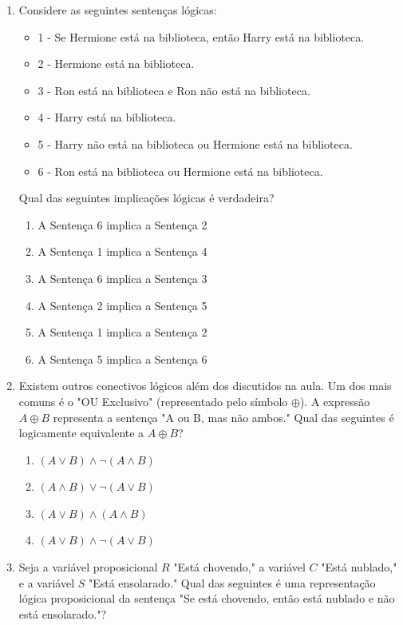 \documentclass[a4paper,12pt]{article}
\begin{document}
\begin{enumerate}
\item Considere as seguintes sentenças lógicas:

\begin{itemize}
    \item 1 - Se Hermione está na biblioteca, então Harry está na biblioteca.
    \item 2 - Hermione está na biblioteca.
    \item 3 - Ron está na biblioteca e Ron não está na biblioteca.
    \item 4 - Harry está na biblioteca.
    \item 5 - Harry não está na biblioteca ou Hermione está na biblioteca.
    \item 6 - Ron está na biblioteca ou Hermione está na biblioteca.
\end{itemize}

Qual das seguintes implicações lógicas é verdadeira?

\begin{enumerate}
    \item A Sentença 6 implica a Sentença 2
    \item A Sentença 1 implica a Sentença 4
    \item A Sentença 6 implica a Sentença 3
    \item A Sentença 2 implica a Sentença 5
    \item A Sentença 1 implica a Sentença 2
    \item A Sentença 5 implica a Sentença 6
\end{enumerate}

\item Existem outros conectivos lógicos além dos discutidos na aula. Um dos mais comuns é o "OU Exclusivo" (representado pelo símbolo $\oplus$). A expressão $A \oplus B$ representa a sentença "A ou B, mas não ambos." Qual das seguintes é logicamente equivalente a $A \oplus B$?

\begin{enumerate}
    \item $(A \lor B) \land \neg (A \land B)$
    \item $(A \land B) \lor \neg (A \lor B)$
    \item $(A \lor B) \land (A \land B)$
    \item $(A \lor B) \land \neg (A \lor B)$
\end{enumerate}

\item Seja a variável proposicional $R$ "Está chovendo," a variável $C$ "Está nublado," e a variável $S$ "Está ensolarado." Qual das seguintes é uma representação lógica proposicional da sentença "Se está chovendo, então está nublado e não está ensolarado."?


\end{enumerate}
\end{document}
